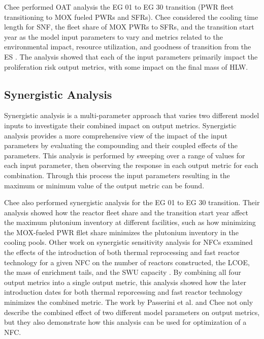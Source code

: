 Chee \cite{chee_sensitivity_2019} performed \gls{OAT} analysis the \gls{EG} 
01 to \gls{EG} 30 transition 
(\gls{PWR} fleet transitioning to \gls{MOX} fueled \glspl{PWR} and \glspl{SFR}). 
Chee considered the cooling time length 
for \gls{SNF}, the fleet share of \gls{MOX} \glspl{PWR} to \glspl{SFR}, and 
the transition start year as the model input parameters to vary and metrics 
related to the environmental impact, resource utilization, and goodness of 
transition from the \gls{ES} \cite{wigeland_nuclear_2014}. The analysis showed 
that each of the input parameters primarily impact the proliferation risk 
output metrics, with some impact on the final mass of \gls{HLW}. 

\subsection{Synergistic Analysis}
Synergistic analysis is a multi-parameter approach that varies two different 
model inputs to investigate their combined impact on output metrics. Synergistic 
analysis provides a more comprehensive view of the impact of the input 
parameters by evaluating the compounding and their coupled effects of the 
parameters.
This analysis is performed by sweeping over a range of values for each input 
parameter, then observing the response in each output metric for each 
combination. Through this process the input parameters resulting in the 
maximum or minimum value of the output metric can be found. 

Chee \cite{chee_sensitivity_2019} also performed synergistic analysis for 
the \gls{EG} 01 to \gls{EG} 30 transition. 
Their analysis showed how the reactor fleet share and the transition start 
year affect the maximum plutonium inventory at different facilities, such as 
how minimizing the \gls{MOX}-fueled \gls{PWR} fllet share minimizes the 
plutonium inventory in the cooling pools. 
Other work on synergistic sensitivity analysis for \glspl{NFC} examined the 
effects of the introduction of both thermal reprocessing and fast reactor 
technology for a given \gls{NFC} on the number of reactors constructed, 
the \gls{LCOE}, the mass of enrichment tails, and the \gls{SWU} 
capacity \cite{passerini_systematic_2014}. By combining all four output 
metrics into a single output metric, this analysis showed how the 
later introduction dates  for both thermal reporcessing 
and fast reactor technology minimizes the combined metric. The work by 
Passerini 
et al. \cite{passerini_systematic_2014} and Chee \cite{chee_sensitivity_2019}
not only describe the combined effect of two different model parameters on 
output metrics, but they also demonstrate how this analysis can be used for 
optimization of a \gls{NFC}. 

